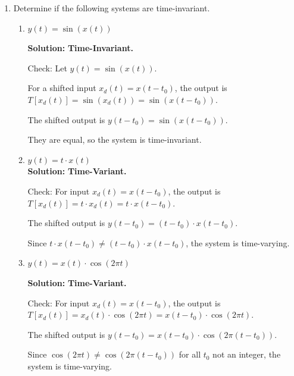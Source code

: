 \documentclass[nohyper,nobib,xcolor=dvipsnames,svgnames,x11names]{tufte-book}
\begin{document}
\begin{enumerate}
\begin{enumerate}
Check superposition: $T[\alpha x_1(t) + \beta x_2(t)] = (\alpha x_1(t) + \beta x_2(t)) \cdot \cos(2\pi t) = \alpha x_1(t)\cos(2\pi t) + \beta x_2(t)\cos(2\pi t)$ 

$\alpha T[x_1(t)] + \beta T[x_2(t)] = \alpha (x_1(t)\cos(2\pi t)) + \beta (x_2(t)\cos(2\pi t))$

They are equal. The system is linear. \textit{(Note: It is linear but time-varying.}

\end{enumerate}


\item Determine if the following systems are time-invariant.

\begin{enumerate}

\item $y(t) = \sin(x(t))$ 

\textbf{Solution:} \textbf{Time-Invariant.} 

Check: Let $y(t) = \sin(x(t))$. 

For a shifted input $x_d(t) = x(t - t_0)$, the output is $T[x_d(t)] = \sin(x_d(t)) = \sin(x(t - t_0))$. 

The shifted output is $y(t - t_0) = \sin(x(t - t_0))$.

They are equal, so the system is time-invariant.

\item  $y(t) = t \cdot x(t)$  \\

\textbf{Solution:} \textbf{Time-Variant.} 

Check: For input $x_d(t) = x(t - t_0)$, the output is $T[x_d(t)] = t \cdot x_d(t) = t \cdot x(t - t_0)$.

The shifted output is $y(t - t_0) = (t - t_0) \cdot x(t - t_0)$.

Since $t \cdot x(t - t_0) \neq (t - t_0) \cdot x(t - t_0)$, the system is time-varying.

\item  $y(t) = x(t) \cdot \cos(2\pi t)$ 

\textbf{Solution:} \textbf{Time-Variant.}

Check: For input $x_d(t) = x(t - t_0)$, the output is $T[x_d(t)] = x_d(t) \cdot \cos(2\pi t) = x(t - t_0) \cdot \cos(2\pi t)$.

The shifted output is $y(t - t_0) = x(t - t_0) \cdot \cos(2\pi (t - t_0))$.


Since $\cos(2\pi t) \neq \cos(2\pi (t - t_0))$ for all $t_0$ not an integer, the system is time-varying.



\end{enumerate}
\end{enumerate}
\end{document}
